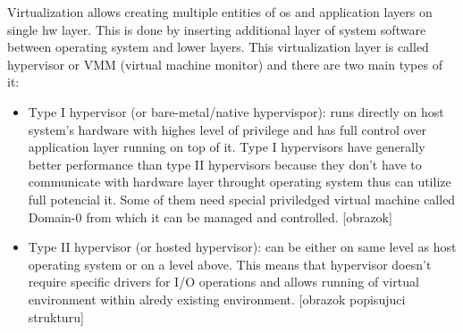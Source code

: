Virtualization allows creating multiple entities of os and application layers on single hw layer. This is done by inserting additional layer of system software between operating system and lower layers. This virtualization layer is called hypervisor or VMM (virtual machine monitor) and there are two main types of it:
\begin{itemize}
\item Type I hypervisor (or bare-metal/native hypervispor): runs directly on host system's hardware with highes level of privilege and has full control over application layer running on top of it. Type I hypervisors have generally better performance than type II hypervisors because they don't have to communicate with hardware layer throught operating system thus can utilize full potencial it. Some of them need special priviledged virtual machine called Domain-0 from which it can be managed and controlled. [obrazok]
\item Type II hypervisor (or hosted hypervisor): can be either on same level as host operating system or on a level above. This means that hypervisor doesn't require specific drivers for I/O operations and allows running of virtual environment within alredy existing environment. [obrazok popisujuci strukturu]
\end{itemize}

